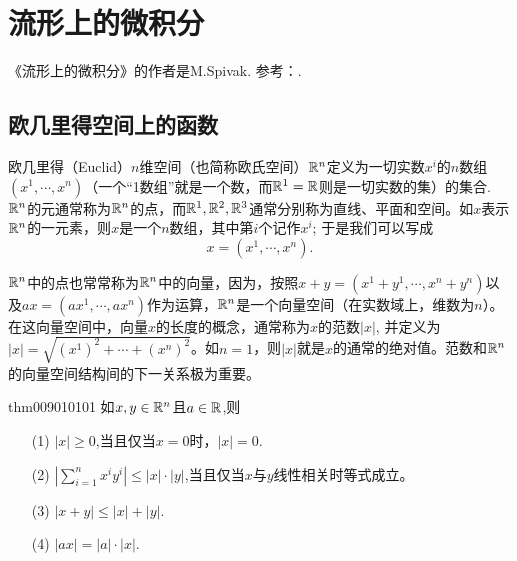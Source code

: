\part{流形上的微积分}
《流形上的微积分》的作者是M.Spivak. 参考：\cite{CalculusOnManifoldsSpivak1980}. 

\chapter{欧几里得空间上的函数}\label{chapter00901}
欧几里得（Euclid）$n$维空间（也简称欧氏空间）$\mathbb{R}^n$定义为一切实数$x^i$的$n$数组$(x^1,\cdots, x^n)$（一个“1数组”就是一个数，而$\mathbb{R}^1=\mathbb{R}$则是一切实数的集）的集合. $\mathbb{R}^n$的元通常称为$\mathbb{R}^n$的点，而$\mathbb{R}^1,\mathbb{R}^2,\mathbb{R}^3$通常分别称为直线、平面和空间。如$x$表示$\mathbb{R}^n$的一元素，则$x$是一个$n$数组，其中第$i$个记作$x^i$; 于是我们可以写成
\[
x = (x^1, \cdots, x^n).
\]

$\mathbb{R}^n$中的点也常常称为$\mathbb{R}^n$中的向量，因为，按照$x+y=(x^1+y^1,\cdots, x^n+y^n)$以及$ax=(ax^1,\cdots, ax^n)$作为运算，$\mathbb{R}^n$是一个向量空间（在实数域上，维数为$n$）。在这向量空间中，向量$x$的长度的概念，通常称为$x$的范数$|x|$, 并定义为$|x| = \sqrt{(x^1)^2 + \cdots + (x^n)^2}$。如$n=1$，则$|x|$就是$x$的通常的绝对值。范数和$\mathbb{R}^n$的向量空间结构间的下一关系极为重要。
\begin{theorem}{}{thm009010101}
如$x,y \in \mathbb{R}^n$且$a \in \mathbb{R}$,则
\begin{enumerate}
\item[(1)] $|x| \ge 0$,当且仅当$x=0$时，$|x|=0$.
\item[(2)] $\left|\sum\limits_{i=1}^{n}{x^iy^i}\right| \le |x| \cdot |y|$,当且仅当$x$与$y$线性相关时等式成立。
\item[(3)] $|x+y| \le |x| + |y|$.
\item[(4)] $|ax| = |a| \cdot |x|$.
\end{enumerate}
\end{theorem}

